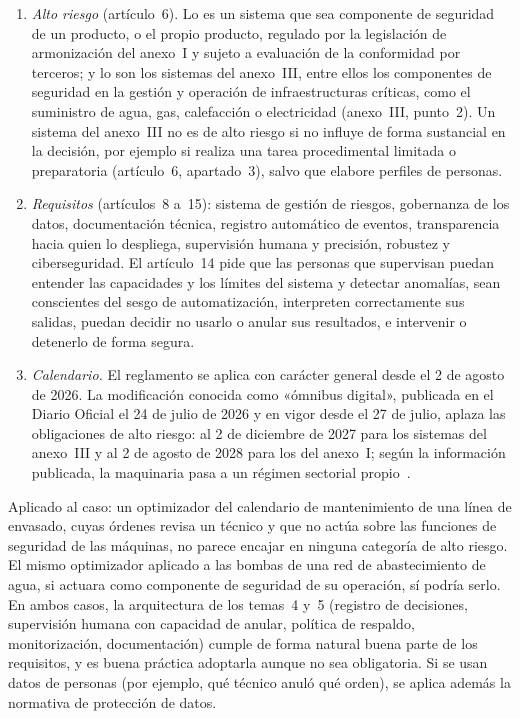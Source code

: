 \begin{enumerate}[label=\arabic*.]
  \item \emph{Alto riesgo} (artículo~6). Lo es un sistema que sea componente de seguridad de un producto, o el propio producto, regulado por la legislación de armonización del anexo~I y sujeto a evaluación de la conformidad por terceros; y lo son los sistemas del anexo~III, entre ellos los componentes de seguridad en la gestión y operación de infraestructuras críticas, como el suministro de agua, gas, calefacción o electricidad (anexo~III, punto~2). Un sistema del anexo~III no es de alto riesgo si no influye de forma sustancial en la decisión, por ejemplo si realiza una tarea procedimental limitada o preparatoria (artículo~6, apartado~3), salvo que elabore perfiles de personas.
  \item \emph{Requisitos} (artículos~8 a~15): sistema de gestión de riesgos, gobernanza de los datos, documentación técnica, registro automático de eventos, transparencia hacia quien lo despliega, supervisión humana y precisión, robustez y ciberseguridad. El artículo~14 pide que las personas que supervisan puedan entender las capacidades y los límites del sistema y detectar anomalías, sean conscientes del sesgo de automatización, interpreten correctamente sus salidas, puedan decidir no usarlo o anular sus resultados, e intervenir o detenerlo de forma segura.
  \item \emph{Calendario.} El reglamento se aplica con carácter general desde el 2 de agosto de 2026. La modificación conocida como «ómnibus digital», publicada en el Diario Oficial el 24 de julio de 2026 y en vigor desde el 27 de julio, aplaza las obligaciones de alto riesgo: al 2 de diciembre de 2027 para los sistemas del anexo~III y al 2 de agosto de 2028 para los del anexo~I; según la información publicada, la maquinaria pasa a un régimen sectorial propio~\cite{omnibus,aiact}.
\end{enumerate}

Aplicado al caso: un optimizador del calendario de mantenimiento de una línea de envasado, cuyas órdenes revisa un técnico y que no actúa sobre las funciones de seguridad de las máquinas, no parece encajar en ninguna categoría de alto riesgo. El mismo optimizador aplicado a las bombas de una red de abastecimiento de agua, si actuara como componente de seguridad de su operación, sí podría serlo. En ambos casos, la arquitectura de los temas~4 y~5 (registro de decisiones, supervisión humana con capacidad de anular, política de respaldo, monitorización, documentación) cumple de forma natural buena parte de los requisitos, y es buena práctica adoptarla aunque no sea obligatoria. Si se usan datos de personas (por ejemplo, qué técnico anuló qué orden), se aplica además la normativa de protección de datos.

